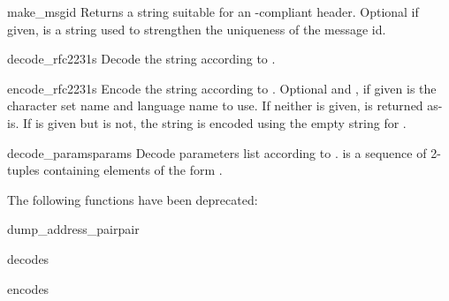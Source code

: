 \begin{funcdesc}{make_msgid}{}
Returns a string suitable for an -compliant
 header.  Optional  if given, is
a string used to strengthen the uniqueness of the message id.
\end{funcdesc}

\begin{funcdesc}{decode_rfc2231}{s}
Decode the string  according to .
\end{funcdesc}

\begin{funcdesc}{encode_rfc2231}{s}
Encode the string  according to .  Optional
 and , if given is the character set name
and language name to use.  If neither is given,  is returned
as-is.  If  is given but  is not, the
string is encoded using the empty string for .
\end{funcdesc}

\begin{funcdesc}{decode_params}{params}
Decode parameters list according to .   is a
sequence of 2-tuples containing elements of the form
.
\end{funcdesc}

The following functions have been deprecated:

\begin{funcdesc}{dump_address_pair}{pair}
\end{funcdesc}

\begin{funcdesc}{decode}{s}
\end{funcdesc}


\begin{funcdesc}{encode}{s}
\end{funcdesc}

